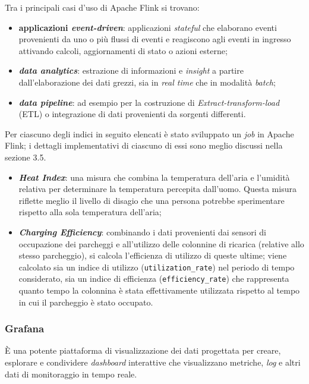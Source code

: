 Tra i principali casi d'uso di Apache Flink si trovano:
\begin{itemize}
	\item \textbf{applicazioni \textit{event-driven}}: applicazioni \textit{stateful} che elaborano eventi provenienti da uno o più flussi di eventi e reagiscono agli eventi in ingresso attivando calcoli, aggiornamenti di stato o azioni esterne;
	\item \textbf{\textit{data analytics}}: estrazione di informazioni e \textit{insight} a partire dall'elaborazione dei dati grezzi, sia in \textit{real time} che in modalità \textit{batch};
	\item \textbf{\textit{data pipeline}}: ad esempio per la costruzione di \textit{Extract-transform-load} (ETL) o integrazione di dati provenienti da sorgenti differenti.
\end{itemize}

Per ciascuno degli indici in seguito elencati è stato sviluppato un \textit{job} in Apache Flink; i dettagli implementativi di ciascuno di essi sono meglio discussi nella sezione 3.5. %
\begin{itemize}
	\item \textbf{\textit{Heat Index}}: una misura che combina la temperatura dell'aria e l'umidità relativa per determinare la temperatura percepita dall'uomo. Questa misura riflette meglio il livello di disagio che una persona potrebbe sperimentare rispetto alla sola temperatura dell'aria;
	\item \textbf{\textit{Charging Efficiency}}: combinando i dati provenienti dai sensori di occupazione dei parcheggi e all'utilizzo delle colonnine di ricarica (relative
	      allo stesso parcheggio), si calcola l'efficienza di utilizzo di queste ultime; viene calcolato sia un indice di utilizzo (\texttt{utilization\_rate}) nel periodo
	      di tempo considerato, sia un indice di efficienza (\texttt{efficiency\_rate}) che rappresenta quanto tempo la colonnina è stata effettivamente utilizzata rispetto
	      al tempo in cui il parcheggio è stato occupato.
\end{itemize}

\subsubsection{Grafana}
È una potente piattaforma di visualizzazione dei dati progettata per creare, esplorare e condividere \textit{dashboard}  interattive che visualizzano metriche, \textit{log} e altri dati di monitoraggio in tempo reale.


